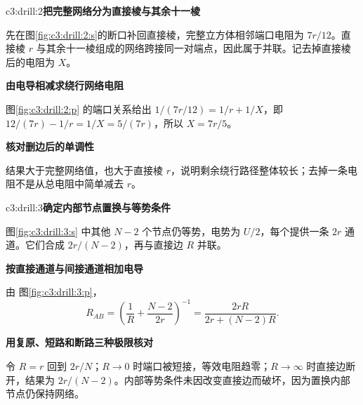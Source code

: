 \begin{drillsolution}{c3:drill:2}\textbf{把完整网络分为直接棱与其余十一棱}\par\nobreak
先在图\ref{fig:c3:drill:2:s}的断口补回直接棱，完整立方体相邻端口电阻为 $7r/12$。直接棱 $r$ 与其余十一棱组成的网络跨接同一对端点，因此属于并联。记去掉直接棱后的电阻为 $X$。



\par\medskip{}\noindent\textbf{由电导相减求绕行网络电阻}\par\nobreak
图\ref{fig:c3:drill:2:p} 的端口关系给出 $1/(7r/12)=1/r+1/X$，即 $12/(7r)-1/r=1/X=5/(7r)$，所以 $X=7r/5$。

\par\medskip{}\noindent\textbf{核对删边后的单调性}\par\nobreak
结果大于完整网络值，也大于直接棱 $r$，说明剩余绕行路径整体较长；去掉一条电阻不是从总电阻中简单减去 $r$。\end{drillsolution}
\begin{drillsolution}{c3:drill:3}\textbf{确定内部节点置换与等势条件}\par\nobreak
图\ref{fig:c3:drill:3:s} 中其他 $N-2$ 个节点仍等势，电势为 $U/2$，每个提供一条 $2r$ 通道。它们合成 $2r/(N-2)$，再与直接边 $R$ 并联。



\par\medskip{}\noindent\textbf{按直接通道与间接通道相加电导}\par\nobreak
由 图\ref{fig:c3:drill:3:p}，
\[
 R_{AB}=\left(\frac1R+\frac{N-2}{2r}\right)^{-1}
 =\frac{2rR}{2r+(N-2)R}.
\]


\par\medskip{}\noindent\textbf{用复原、短路和断路三种极限核对}\par\nobreak
令 $R=r$ 回到 $2r/N$；$R\to0$ 时端口被短接，等效电阻趋零；$R\to\infty$ 时直接边断开，结果为 $2r/(N-2)$。内部等势条件未因改变直接边而破坏，因为置换内部节点仍保持网络。\end{drillsolution}
